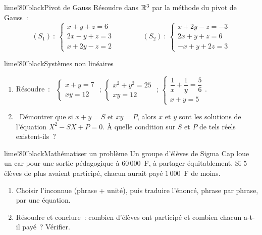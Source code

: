 \begin{exo}{lime!80!black}{Pivot de Gauss }
Résoudre dans $\mathbb{R}^3$ par la méthode du pivot de Gauss~:
\[
(S_1)~:\ \begin{cases}x+y+z=6\\2x-y+z=3\\x+2y-z=2\end{cases}
\qquad\qquad
(S_2)~:\ \begin{cases}x+2y-z=-3\\2x+y+z=6\\-x+y+2z=3\end{cases}
\]
\end{exo}

\begin{exo}{lime!80!black}{Systèmes non linéaires \ \demo}
\begin{enumerate}
  \item Résoudre~: \ $\begin{cases}x+y=7\\xy=12\end{cases}$ \quad ; \quad $\begin{cases}x^2+y^2=25\\xy=12\end{cases}$ \quad ; \quad $\begin{cases}\dfrac1x+\dfrac1y=\dfrac56\\[4pt]x+y=5\end{cases}$.
  \item \demo\ Démontrer que si $x+y=S$ et $xy=P$, alors $x$ et $y$ sont les solutions de l'équation $X^2-SX+P=0$. À quelle condition sur $S$ et $P$ de tels réels existent-ils~?
\end{enumerate}
\end{exo}

\begin{exo}{lime!80!black}{Mathématiser un problème }
Un groupe d'élèves de Sigma Cap loue un car pour une sortie pédagogique à $60\,000$~F, à partager équitablement. Si $5$ élèves de plus avaient participé, chacun aurait payé $1\,000$~F de moins.
\begin{enumerate}
  \item Choisir l'inconnue (phrase + unité), puis traduire l'énoncé, phrase par phrase, par une équation.
  \item Résoudre et conclure~: combien d'élèves ont participé et combien chacun a-t-il payé~? Vérifier.
\end{enumerate}
\end{exo}

